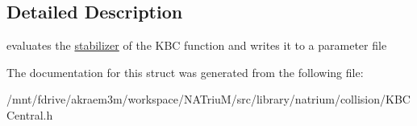 \subsection{Detailed Description}
evaluates the \hyperlink{structnatrium_1_1KBCCentral_1_1stabilizer}{stabilizer} of the KBC function and writes it to a parameter file 

The documentation for this struct was generated from the following file:\begin{DoxyCompactItemize}
\item 
/mnt/fdrive/akraem3m/workspace/NATriuM/src/library/natrium/collision/KBCCentral.h\end{DoxyCompactItemize}
